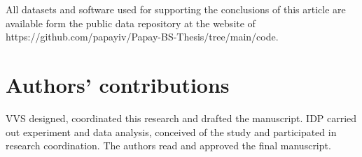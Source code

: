 \documentclass[12pt,preprint]{elsarticle}
\begin{document}
All datasets and software used for supporting the conclusions of this article are available form the public data repository at the website of https://github.com/papayiv/Papay-BS-Thesis/tree/main/code.

\section{Authors' contributions}

VVS designed, coordinated this research and drafted the manuscript. IDP carried out experiment and data analysis, conceived of the study and participated in research coordination. The authors read and approved the final manuscript.



\end{document}
